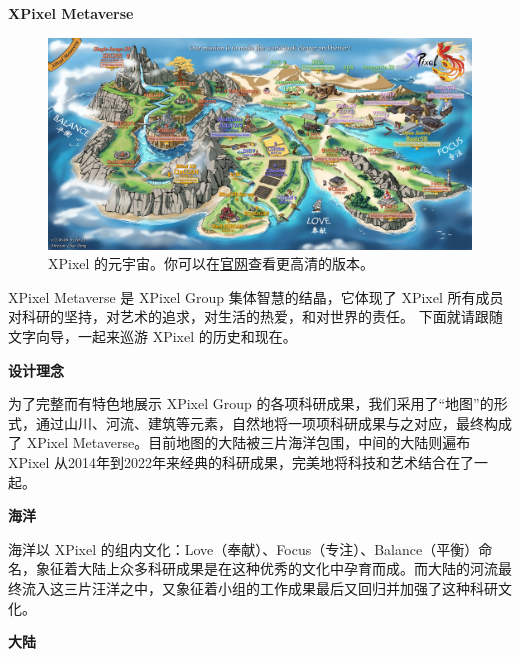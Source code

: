 \documentclass[../main.tex]{subfiles}
\begin{document}
\newpage
{\LARGE\textbf{ XPixel Metaverse}}

\begin{figure}[h]
    \vspace{1cm}
    \begin{center}
        \includegraphics[width=\linewidth]{figures/XPixelMetaverse_small.jpg}
        \vspace{-0.7cm}
        \caption{XPixel 的元宇宙。你可以在\href{https://xpixel.group/2022/06/06/poster.html}{官网}查看更高清的版本。}
    \end{center}
\end{figure}

XPixel Metaverse 是 XPixel Group 集体智慧的结晶，它体现了 XPixel 所有成员对科研的坚持，对艺术的追求，对生活的热爱，和对世界的责任。
下面就请跟随文字向导，一起来巡游 XPixel 的历史和现在。

{\large\textbf{设计理念}}

为了完整而有特色地展示 XPixel Group 的各项科研成果，我们采用了“地图”的形式，通过山川、河流、建筑等元素，自然地将一项项科研成果与之对应，最终构成了 XPixel Metaverse。目前地图的大陆被三片海洋包围，中间的大陆则遍布 XPixel 从2014年到2022年来经典的科研成果，完美地将科技和艺术结合在了一起。

\textbf{海洋}

海洋以 XPixel 的组内文化：Love（奉献）、Focus（专注）、Balance（平衡）命名，象征着大陆上众多科研成果是在这种优秀的文化中孕育而成。而大陆的河流最终流入这三片汪洋之中，又象征着小组的工作成果最后又回归并加强了这种科研文化。

\textbf{大陆}
\end{document}
